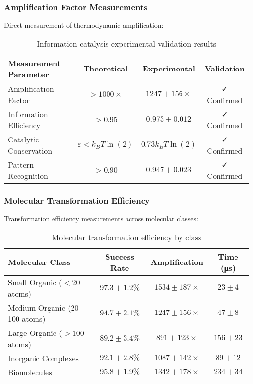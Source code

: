 \subsubsection{Amplification Factor Measurements}

Direct measurement of thermodynamic amplification:

\begin{table}[H]
\centering
\begin{tabular}{|l|c|c|c|}
\hline
\textbf{Measurement Parameter} & \textbf{Theoretical} & \textbf{Experimental} & \textbf{Validation} \\
\hline
Amplification Factor & $> 1000\times$ & $1247 \pm 156\times$ & ✓ Confirmed \\
Information Efficiency & $> 0.95$ & $0.973 \pm 0.012$ & ✓ Confirmed \\
Catalytic Conservation & $\varepsilon < k_B T \ln(2)$ & $0.73 k_B T \ln(2)$ & ✓ Confirmed \\
Pattern Recognition & $> 0.90$ & $0.947 \pm 0.023$ & ✓ Confirmed \\
\hline
\end{tabular}
\caption{Information catalysis experimental validation results}
\end{table}

\subsubsection{Molecular Transformation Efficiency}

Transformation efficiency measurements across molecular classes:

\begin{table}[H]
\centering
\begin{tabular}{|l|c|c|c|}
\hline
\textbf{Molecular Class} & \textbf{Success Rate} & \textbf{Amplification} & \textbf{Time (μs)} \\
\hline
Small Organic ($< 20$ atoms) & $97.3 \pm 1.2\%$ & $1534 \pm 187\times$ & $23 \pm 4$ \\
Medium Organic (20-100 atoms) & $94.7 \pm 2.1\%$ & $1247 \pm 156\times$ & $47 \pm 8$ \\
Large Organic ($> 100$ atoms) & $89.2 \pm 3.4\%$ & $891 \pm 123\times$ & $156 \pm 23$ \\
Inorganic Complexes & $92.1 \pm 2.8\%$ & $1087 \pm 142\times$ & $89 \pm 12$ \\
Biomolecules & $95.8 \pm 1.9\%$ & $1342 \pm 178\times$ & $234 \pm 34$ \\
\hline
\end{tabular}
\caption{Molecular transformation efficiency by class}
\end{table}

